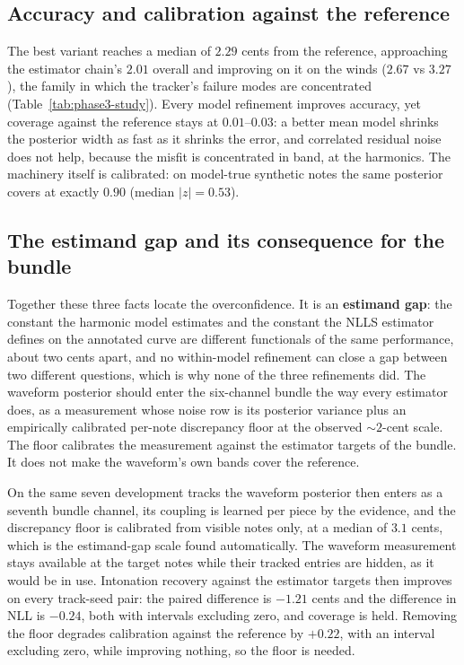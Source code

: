 \documentclass[11pt,a4paper]{report}
\begin{document}
\subsection{Accuracy and calibration against the reference}

The best variant reaches a median of $2.29$ cents from the reference,
approaching the estimator chain's $2.01$ overall and improving on it on the
winds ($2.67$ vs $3.27$), the family in which the tracker's failure modes
are concentrated (Table~\ref{tab:phase3-study}). Every model refinement
improves accuracy, yet coverage against the reference stays at
$0.01$--$0.03$: a better mean model shrinks the posterior width as fast as
it shrinks the error, and correlated residual noise does not help, because
the misfit is concentrated in band, at the harmonics. The machinery itself
is calibrated: on model-true synthetic notes the same posterior covers at
exactly $0.90$ (median $|z| = 0.53$).

\subsection{The estimand gap and its consequence for the bundle}

Together these three facts locate the overconfidence. It is an
\textbf{estimand gap}: the constant the harmonic model estimates and the
constant the NLLS estimator defines on the annotated curve are different
functionals of the same performance, about two cents apart, and no
within-model refinement can close a gap between two different questions,
which is why none of the three refinements did. The waveform posterior should enter the six-channel bundle the way
every estimator does, as a measurement whose noise row is its posterior
variance plus an empirically calibrated per-note discrepancy floor at the
observed $\sim 2$-cent scale. The floor calibrates the measurement against
the estimator targets of the bundle. It does not make the waveform's own
bands cover the reference.

On the same seven development tracks the waveform posterior then enters as
a seventh bundle channel, its coupling is learned per piece by the evidence, and the
discrepancy floor is calibrated from visible notes only, at a median of
$3.1$ cents, which is the estimand-gap scale found automatically. The
waveform measurement stays available at the target notes while their
tracked entries are hidden, as it would be in use. Intonation
recovery against the estimator targets then improves on every track-seed
pair: the paired difference is $-1.21$ cents and the difference in NLL is
$-0.24$, both with intervals excluding zero, and coverage is held. Removing the floor degrades
calibration against the reference by $+0.22$, with an interval excluding
zero, while improving nothing, so the floor is needed.
\end{document}
